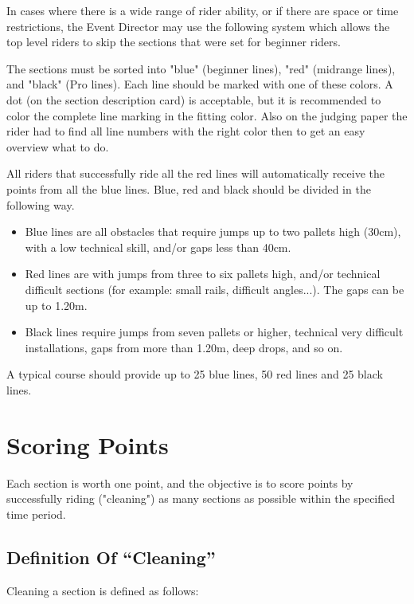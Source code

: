 In cases where there is a wide range of rider ability, or if there are space or time restrictions, the Event Director may use the following system which allows the top level riders to skip the sections that were set for beginner riders.

The sections must be sorted into "blue" (beginner lines), "red" (midrange lines), and "black" (Pro lines). 
Each line should be marked with one of these colors. 
A dot (on the section description card) is acceptable, but it is recommended to color the complete line marking in the fitting color. 
Also on the judging paper the rider had to find all line numbers with the right color then to get an easy overview what to do.

All riders that successfully ride all the red lines will automatically receive the points from all the blue lines.
Blue, red and black should be divided in the following way.

\begin{itemize}
\item Blue lines are all obstacles that require jumps up to two pallets high (30cm), with a low technical skill, and/or gaps less than 40cm.
\item Red lines are with jumps from three to six pallets high, and/or technical difficult sections (for example: small rails, difficult angles...). The gaps can be up to 1.20m.
\item Black lines require jumps from seven pallets or higher, technical very difficult installations, gaps from more than 1.20m, deep drops, and so on. 
\end{itemize}
A typical course should provide up to 25 blue lines, 50 red lines and 25 black lines.


\section{Scoring Points}
Each section is worth one point, and the objective is to score points by successfully riding ("cleaning") as many sections as possible within the specified time period.

\subsection{Definition Of “Cleaning”}
Cleaning a section is defined as follows:

